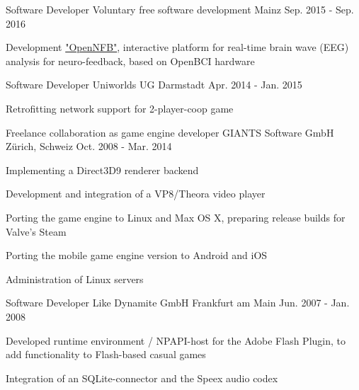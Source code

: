 \begin{cventries}
  \cventry
    {Software Developer} %
    {Voluntary free software development} %
    {Mainz} %
    {Sep. 2015 - Sep. 2016} %
    {
      \begin{cvitems} %
        \item {Development \href{https://github.com/strfry/OpenNFB}{"OpenNFB"}, interactive platform for real-time brain wave (EEG) analysis for neuro-feedback, based on OpenBCI hardware}
      \end{cvitems}
    }

  \cventry
    {Software Developer} %
    {Uniworlds UG} %
    {Darmstadt} %
    {Apr. 2014 - Jan. 2015} %
    {
      \begin{cvitems} %
        \item {Retrofitting network support for 2-player-coop game}
      \end{cvitems}
    }

  \cventry
    {Freelance collaboration as game engine developer} %
    {GIANTS Software GmbH} %
    {Zürich, Schweiz} %
    {Oct. 2008 - Mar. 2014} %
    {
      \begin{cvitems} %
        \item {Implementing a Direct3D9 renderer backend}
        \item {Development and integration of a VP8/Theora video player}
        \item {Porting the game engine to Linux and Max OS X, preparing release builds for Valve's Steam}
        \item {Porting the mobile game engine version to Android and iOS}
        \item {Administration of Linux servers}
      \end{cvitems}
    }

  \cventry
    {Software Developer} %
    {Like Dynamite GmbH} %
    {Frankfurt am Main} %
    {Jun. 2007 - Jan. 2008} %
    {
      \begin{cvitems} %
        \item {Developed runtime environment / NPAPI-host for the Adobe Flash Plugin, to add functionality to Flash-based casual games}
        \item {Integration of an SQLite-connector and the Speex audio codex}
      \end{cvitems}
    }


\end{cventries}
